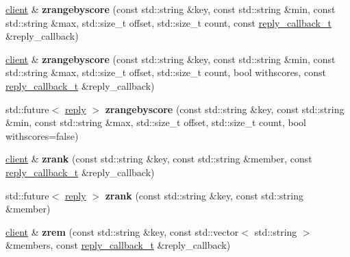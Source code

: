 \begin{DoxyCompactItemize}
\mbox{\hyperlink{classcpp__redis_1_1client}{client}} \& {\bfseries zrangebyscore} (const std\+::string \&key, const std\+::string \&min, const std\+::string \&max, std\+::size\+\_\+t offset, std\+::size\+\_\+t count, const \mbox{\hyperlink{classcpp__redis_1_1client_af7a65eb21aa25230bfbb0b0203c4fc04}{reply\+\_\+callback\+\_\+t}} \&reply\+\_\+callback)
\item 
\mbox{\label{classcpp__redis_1_1client_abbe9cc5870e5a0bd692ac08f36beea91}} 
\mbox{\hyperlink{classcpp__redis_1_1client}{client}} \& {\bfseries zrangebyscore} (const std\+::string \&key, const std\+::string \&min, const std\+::string \&max, std\+::size\+\_\+t offset, std\+::size\+\_\+t count, bool withscores, const \mbox{\hyperlink{classcpp__redis_1_1client_af7a65eb21aa25230bfbb0b0203c4fc04}{reply\+\_\+callback\+\_\+t}} \&reply\+\_\+callback)
\item 
\mbox{\label{classcpp__redis_1_1client_afe3464407fae46d932cf8a527be1b4ab}} 
std\+::future$<$ \mbox{\hyperlink{classcpp__redis_1_1reply}{reply}} $>$ {\bfseries zrangebyscore} (const std\+::string \&key, const std\+::string \&min, const std\+::string \&max, std\+::size\+\_\+t offset, std\+::size\+\_\+t count, bool withscores=false)
\item 
\mbox{\label{classcpp__redis_1_1client_a5563d5240de4bbdbf6ed5dd8cc92a67a}} 
\mbox{\hyperlink{classcpp__redis_1_1client}{client}} \& {\bfseries zrank} (const std\+::string \&key, const std\+::string \&member, const \mbox{\hyperlink{classcpp__redis_1_1client_af7a65eb21aa25230bfbb0b0203c4fc04}{reply\+\_\+callback\+\_\+t}} \&reply\+\_\+callback)
\item 
\mbox{\label{classcpp__redis_1_1client_acf680674a3944a3baaa36f888250610e}} 
std\+::future$<$ \mbox{\hyperlink{classcpp__redis_1_1reply}{reply}} $>$ {\bfseries zrank} (const std\+::string \&key, const std\+::string \&member)
\item 
\mbox{\label{classcpp__redis_1_1client_ae33a0ea1127a5da870db4354fad2bd10}} 
\mbox{\hyperlink{classcpp__redis_1_1client}{client}} \& {\bfseries zrem} (const std\+::string \&key, const std\+::vector$<$ std\+::string $>$ \&members, const \mbox{\hyperlink{classcpp__redis_1_1client_af7a65eb21aa25230bfbb0b0203c4fc04}{reply\+\_\+callback\+\_\+t}} \&reply\+\_\+callback)

\end{DoxyCompactItemize}
